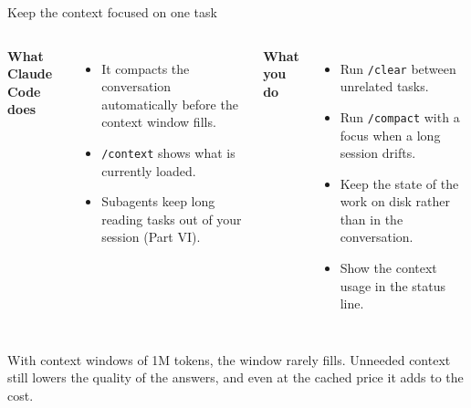 \documentclass[aspectratio=169,10pt]{beamer}
\newcommand{\boristip}[1]{%
  \tikz[baseline=(X.base)]{\node[fill=level4,text=white,
  rounded corners=2pt,inner sep=2pt,font=\tiny\bfseries](X){TIP #1};}}
\begin{document}
\begin{frame}{Keep the context focused on one task}
\begin{columns}[T]
\textbf{What Claude Code does}
\begin{itemize}\itemsep8pt
  \item It compacts the conversation automatically before the context window fills.
  \item \texttt{/context} shows what is currently loaded.
  \item Subagents keep long reading tasks out of your session (Part VI).
\end{itemize}
\textbf{What you do}
\begin{itemize}\itemsep8pt
  \item Run \texttt{/clear} between unrelated tasks.
  \item Run \texttt{/compact} with a focus when a long session drifts.
  \item Keep the state of the work on disk rather than in the conversation.
  \item \boristip{7} Show the context usage in the status line.
\end{itemize}
\end{columns}

\vspace{1.2em}
{\small\textcolor{uzhgreydark}{With context windows of 1M tokens, the window rarely fills. Unneeded context still lowers the quality of the answers, and even at the cached price it adds to the cost.}}
\end{frame}
\end{document}
